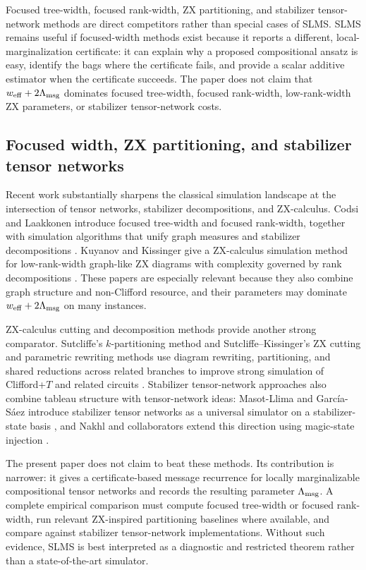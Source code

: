 Focused tree-width, focused rank-width, ZX partitioning, and stabilizer tensor-network methods are direct competitors rather than special cases of SLMS. SLMS remains useful if focused-width methods exist because it reports a different, local-marginalization certificate: it can explain why a proposed compositional ansatz is easy, identify the bags where the certificate fails, and provide a scalar additive estimator when the certificate succeeds. The paper does not claim that \(w_{\mathrm{eff}}+2\Lambda_{\mathrm{msg}}\) dominates focused tree-width, focused rank-width, low-rank-width ZX parameters, or stabilizer tensor-network costs.

\subsection{Focused width, ZX partitioning, and stabilizer tensor networks}

Recent work substantially sharpens the classical simulation landscape at the intersection of tensor networks, stabilizer decompositions, and ZX-calculus. Codsi and Laakkonen introduce focused tree-width and focused rank-width, together with simulation algorithms that unify graph measures and stabilizer decompositions \citep{CodsiLaakkonen2026}. Kuyanov and Kissinger give a ZX-calculus simulation method for low-rank-width graph-like ZX diagrams with complexity governed by rank decompositions \citep{KuyanovKissinger2026}. These papers are especially relevant because they also combine graph structure and non-Clifford resource, and their parameters may dominate \(w_{\mathrm{eff}}+2\Lambda_{\mathrm{msg}}\) on many instances.

ZX-calculus cutting and decomposition methods provide another strong comparator. Sutcliffe's \(k\)-partitioning method and Sutcliffe--Kissinger's ZX cutting and parametric rewriting methods use diagram rewriting, partitioning, and shared reductions across related branches to improve strong simulation of Clifford+\(T\) and related circuits \citep{Sutcliffe2024KPartition,SutcliffeKissinger2024Cutting,SutcliffeKissinger2025Parametric}. Stabilizer tensor-network approaches also combine tableau structure with tensor-network ideas: Masot-Llima and Garc\'ia-S\'aez introduce stabilizer tensor networks as a universal simulator on a stabilizer-state basis \citep{MasotLlimaGarciaSaez2024}, and Nakhl and collaborators extend this direction using magic-state injection \citep{NakhlEtAl2025}.

The present paper does not claim to beat these methods. Its contribution is narrower: it gives a certificate-based message recurrence for locally marginalizable compositional tensor networks and records the resulting parameter \(\Lambda_{\mathrm{msg}}\). A complete empirical comparison must compute focused tree-width or focused rank-width, run relevant ZX-inspired partitioning baselines where available, and compare against stabilizer tensor-network implementations. Without such evidence, SLMS is best interpreted as a diagnostic and restricted theorem rather than a state-of-the-art simulator.

